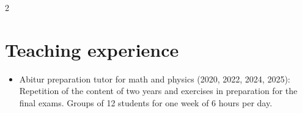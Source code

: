 \documentclass[lighthipster]{simplehipstercv}
\begin{document}
\begin{paracol}{2}
\vspace{0.4em}


\section*{Teaching experience}

\begin{itemize}
    \item Abitur preparation tutor for math and physics (2020, 2022, 2024, 2025): Repetition of the content of two years and exercises in preparation for the final exams. Groups of 12 students for one week of 6 hours per day.
\end{itemize}

\vfill{}
\vfill{} %

\end{paracol}
\end{document}

